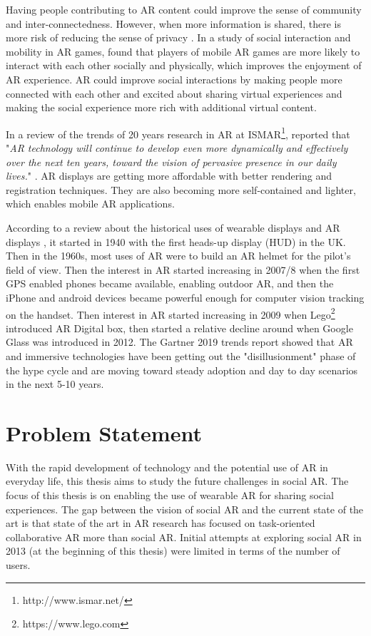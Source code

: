 Having people contributing to AR content could improve the sense of community and inter-connectedness. However, when more information is shared, there is more risk of reducing the sense of privacy \cite{Olsson2013}. In a study of social interaction and mobility in AR games, \textcite{Schmalstieg_144} found that players of mobile AR games are more likely to interact with each other socially and physically, which improves the enjoyment of AR experience. AR could improve social interactions by making people more connected with each other and excited about sharing virtual experiences and making the social experience more rich with additional virtual content. 

In a review of the trends of 20 years research in AR at ISMAR\footnote{http://www.ismar.net/}, \textcite{Zhou2008, Kim2018} reported that "\textit{AR technology will continue to develop even more dynamically and effectively over the next ten years, toward the vision of pervasive presence in our daily lives.}" \cite{Kim2018}. AR displays are getting more affordable with better rendering and registration techniques. They are also becoming more self-contained and lighter, which enables mobile AR applications.

According to a review about the historical uses of wearable displays and AR displays \cite{Peddie2017}, it started in 1940 with the first heads-up display (HUD) in the UK. Then in the 1960s, most uses of AR were to build an AR helmet for the pilot's field of view. Then the interest in AR started increasing in 2007/8 when the first GPS enabled phones became available, enabling outdoor AR, and then the iPhone and android devices became powerful enough for computer vision tracking on the handset. 
Then interest in AR started increasing in 2009 when Lego\footnote{https://www.lego.com} introduced AR Digital box, then started a relative decline around when Google Glass was introduced in 2012. The Gartner 2019 trends report \cite{gartner2019} showed that AR and immersive technologies have been getting out the "disillusionment" phase of the hype cycle and are moving toward steady adoption and day to day scenarios in the next 5-10 years.

\section{Problem Statement}

With the rapid development of technology and the potential use of AR in everyday life, this thesis aims to study the future challenges in social AR. The focus of this thesis is on enabling the use of wearable AR for sharing social experiences. The gap between the vision of social AR and the current state of the art is that state of the art in AR research has focused on task-oriented collaborative AR more than social AR. Initial attempts at exploring social AR in 2013 (at the beginning of this thesis) were limited in terms of the number of users. 

